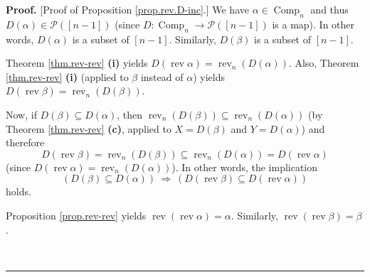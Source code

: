 \documentclass[numbers=enddot,12pt,final,onecolumn,notitlepage]{scrartcl}%
\theoremstyle{definition}
\newenvironment{proof}[1][Proof]{\noindent\textbf{#1.} }{\ \rule{0.5em}{0.5em}}
\begin{document}
\begin{proof}
[Proof of Proposition \ref{prop.rev.D-inc}.] We have $\alpha\in
\operatorname*{Comp}\nolimits_{n}$ and thus $D\left(  \alpha\right)
\in\mathcal{P}\left(  \left[  n-1\right]  \right)  $ (since
$D:\operatorname*{Comp}\nolimits_{n}\rightarrow\mathcal{P}\left(  \left[
n-1\right]  \right)  $ is a map). In other words, $D\left(  \alpha\right)  $
is a subset of $\left[  n-1\right]  $. Similarly, $D\left(  \beta\right)  $ is
a subset of $\left[  n-1\right]  $.

Theorem \ref{thm.rev-rev} \textbf{(i)} yields $D\left(  \operatorname*{rev}%
\alpha\right)  =\operatorname*{rev}\nolimits_{n}\left(  D\left(
\alpha\right)  \right)  $. Also, Theorem \ref{thm.rev-rev} \textbf{(i)}
(applied to $\beta$ instead of $\alpha$) yields $D\left(  \operatorname*{rev}%
\beta\right)  =\operatorname*{rev}\nolimits_{n}\left(  D\left(  \beta\right)
\right)  $.

Now, if $D\left(  \beta\right)  \subseteq D\left(  \alpha\right)  $, then
$\operatorname*{rev}\nolimits_{n}\left(  D\left(  \beta\right)  \right)
\subseteq\operatorname*{rev}\nolimits_{n}\left(  D\left(  \alpha\right)
\right)  $ (by Theorem \ref{thm.rev-rev} \textbf{(c)}, applied to $X=D\left(
\beta\right)  $ and $Y=D\left(  \alpha\right)  $) and therefore%
\[
D\left(  \operatorname*{rev}\beta\right)  =\operatorname*{rev}\nolimits_{n}%
\left(  D\left(  \beta\right)  \right)  \subseteq\operatorname*{rev}%
\nolimits_{n}\left(  D\left(  \alpha\right)  \right)  =D\left(
\operatorname*{rev}\alpha\right)
\]
(since $D\left(  \operatorname*{rev}\alpha\right)  =\operatorname*{rev}%
\nolimits_{n}\left(  D\left(  \alpha\right)  \right)  $). In other words, the
implication
\begin{equation}
\left(  D\left(  \beta\right)  \subseteq D\left(  \alpha\right)  \right)
\ \Longrightarrow\ \left(  D\left(  \operatorname*{rev}\beta\right)  \subseteq
D\left(  \operatorname*{rev}\alpha\right)  \right)
\label{pf.prop.rev.D-inc.back}%
\end{equation}
holds.

Proposition \ref{prop.rev-rev} yields $\operatorname*{rev}\left(
\operatorname*{rev}\alpha\right)  =\alpha$. Similarly, $\operatorname*{rev}%
\left(  \operatorname*{rev}\beta\right)  =\beta$.


\end{proof}
\end{document}
